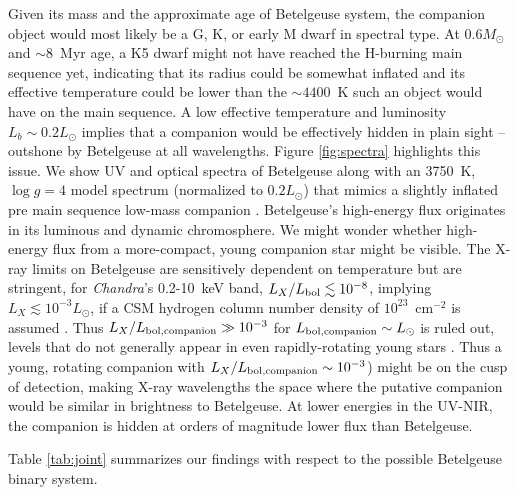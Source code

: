 \documentclass[twocolumn]{aastex631}
\begin{document}
Given its mass and the approximate age of Betelgeuse system, the companion object would most likely be a G, K, or early M dwarf in spectral type. At $0.6 M_\odot$ and $\sim 8$~Myr age, a K5 dwarf might not have reached the H-burning main sequence yet, indicating that its radius could be somewhat inflated and its effective temperature could be lower than the $\sim 4400$~K such an object would have on the main sequence. A low effective temperature and luminosity $L_b \sim 0.2 L_\odot$ implies that a companion would be effectively hidden in plain sight -- outshone by Betelgeuse at all wavelengths.  Figure \ref{fig:spectra} highlights this issue. We show UV and optical spectra of  Betelgeuse along with an 3750~K, $\log g=4$ model spectrum (normalized to $0.2L_\odot$) that mimics a slightly inflated pre main sequence low-mass companion \citep{1997A&A...318..841C}. Betelgeuse's high-energy flux originates in its luminous and dynamic chromosphere. We might wonder whether high-energy flux from a more-compact, young companion star might be visible. The X-ray limits on Betelgeuse are sensitively dependent on temperature but are stringent, for {\it Chandra}'s 0.2-10~keV band, $L_X/L_{\rm bol}\lesssim10^{-8}$, implying $L_X \lesssim 10^{-3}L_\odot$, if a CSM hydrogen column number density of $10^{23}$~cm$^{-2}$  is assumed \citep{2006astro.ph..6387P,2020ATel13501....1K}. Thus $L_X / L_{\rm bol, companion} \gg 10^{-3}$ for $L_{\rm bol, companion}\sim L_\odot$ is ruled out, levels that do not generally appear in even rapidly-rotating young stars \citep{2011ApJ...743...48W}. Thus a young, rotating companion with  $L_X / L_{\rm bol, companion} \sim 10^{-3}$) might be on the cusp of detection, making X-ray wavelengths the space where the putative companion would be similar in brightness to Betelgeuse. At lower energies in the UV-NIR, the companion is hidden at orders of magnitude lower flux than Betelgeuse. 

Table \ref{tab:joint} summarizes our findings with respect to the possible Betelgeuse binary system. 
\end{document}
